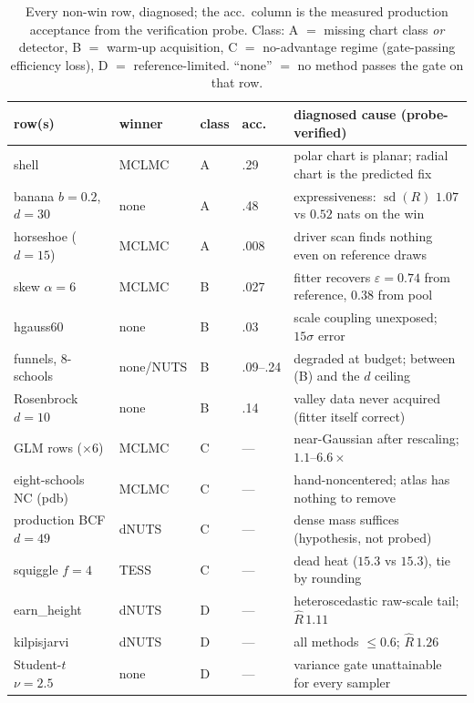 \documentclass[11pt]{article}
\theoremstyle{remark}
\begin{document}
\begin{table}[t]
\caption{Every non-win row, diagnosed; the acc.\ column is the
measured production acceptance from the verification probe. Class: A
$=$ missing chart class \emph{or} detector, B $=$ warm-up
acquisition, C $=$ no-advantage regime (gate-passing efficiency
loss), D $=$ reference-limited. ``none'' $=$ no method passes the
gate on that row.}
\label{tab:failures}
\centering\footnotesize
\setlength{\tabcolsep}{4pt}
\begin{tabular}{lllll}
\toprule
row(s) & winner & class & acc. & diagnosed cause (probe-verified)\\
\midrule
shell & MCLMC & A & .29 & polar chart is planar; radial chart is the predicted fix\\
banana $b{=}0.2$, $d{=}30$ & none & A & .48 & expressiveness: $\operatorname{sd}(R)$ $1.07$ vs $0.52$ nats on the win\\
horseshoe ($d{=}15$) & MCLMC & A & .008 & driver scan finds nothing even on reference draws\\
skew $\alpha{=}6$ & MCLMC & B & .027 & fitter recovers $\varepsilon{=}0.74$ from reference, $0.38$ from pool\\
hgauss60 & none & B & .03 & scale coupling unexposed; $15\sigma$ error\\
funnels, 8-schools & none/NUTS & B & .09--.24 & degraded at budget; between (B) and the $d$ ceiling\\
Rosenbrock $d{=}10$ & none & B & .14 & valley data never acquired (fitter itself correct)\\
GLM rows ($\times6$) & MCLMC & C & --- & near-Gaussian after rescaling; $1.1$--$6.6\times$\\
eight-schools NC (pdb) & MCLMC & C & --- & hand-noncentered; atlas has nothing to remove\\
production BCF $d{=}49$ & dNUTS & C & --- & dense mass suffices (hypothesis, not probed)\\
squiggle $f{=}4$ & TESS & C & --- & dead heat ($15.3$ vs $15.3$), tie by rounding\\
earn\_height & dNUTS & D & --- & heteroscedastic raw-scale tail; $\widehat R\,1.11$\\
kilpisjarvi & dNUTS & D & --- & all methods $\le0.6$; $\widehat R\,1.26$\\
Student-$t$ $\nu{=}2.5$ & none & D & --- & variance gate unattainable for every sampler\\
\bottomrule
\end{tabular}
\end{table}
\end{document}

